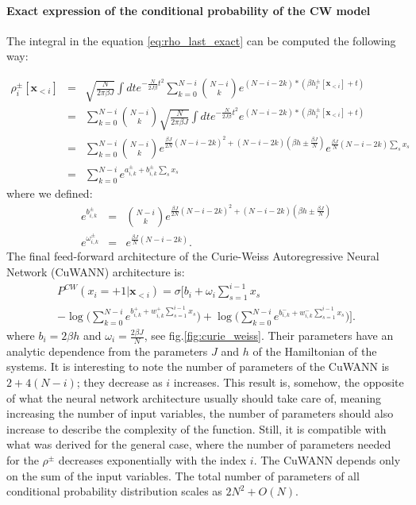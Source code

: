 \documentclass[aps,physrev,10pt,floatfix,longbibliography,nofootinbib,reprint]{revtex4-2}
\begin{document}
 \paragraph{Exact expression of the conditional probability of the CW model}
 The integral in the equation \ref{eq:rho_last_exact} can be computed the following way:

 \begin{eqnarray*}
 \rho_i^{\pm}[\mathbf{x}_{<i}] &=& \sqrt{\frac{N}{2\pi \beta J}}\int dt e^{-\frac{N}{2J \beta}t^{2}} 
 \sum_{k=0}^{N-i} \binom{N-i}{k} e^{(N-i-2k)*(\beta h_i^{\pm}[\mathbf{x}_{<i}] + t)}\\
 &=& \sum_{k=0}^{N-i} \binom{N-i}{k} \sqrt{\frac{N}{2\pi \beta J}}\int dt e^{-\frac{N}{2J \beta}t^{2}} 
  e^{(N-i-2k)*(\beta h_i^{\pm}[\mathbf{x}_{<i}] + t)}\\
&=& \sum_{k=0}^{N-i} \binom{N-i}{k}e^{\frac{\beta J}{2N}\left(N-i-2k\right)^{2}+\left(N-i-2k\right)\left(\beta h \pm \frac{\beta J}{N}\right)} e^{\frac{\beta J}{N}\left(N-i-2k\right) \sum_s x_s} \\
&=& \sum_{k=0}^{N-i} e^{a_{i,k}^{\pm} + b_{i,k}^{\pm} \sum_s x_s} 
\end{eqnarray*}
where we defined:
\begin{eqnarray}
\label{eq:params}
e^{b_{i,k}^{\pm}} & = & \binom{N-i}{k}e^{\frac{\beta J}{2N}\left(N-i-2k\right)^{2}+\left(N-i-2k\right)\left(\beta h \pm \frac{\beta J}{N}\right)}\\
e^{\omega_{i,k}^{\pm}} & = & e^{\frac{\beta J}{N}\left(N-i-2k\right)}.
\end{eqnarray}
The final feed-forward architecture of the Curie-Weiss Autoregressive Neural Network (CuWANN) architecture is:
\begin{multline}
\label{eq:curie_weiss_cond}
P^{CW}\left(x_{i}=+1|\mathbf{x}_{<i}\right)  =   \sigma \bigg[b_{i}+\omega_{i}\sum_{s=1}^{i-1}x_{s}\\
-\log\big(\sum_{k=0}^{N-i}e^{b_{i,k}^{+} + 
w_{i,k}^{+}\sum_{s=1}^{i-1}x_{s}}\big)+\log\big(\sum_{k=0}^{N-i}e^{b_{i,k}^{-} + w_{i,k}^{-}\sum_{s=1}^{i-1}x_{s}}\big)\bigg].
\end{multline}
where $b_i=2\beta h$ and $\omega_i=\frac{2\beta J}{N}$, see fig.\ref{fig:curie_weiss}. Their parameters have an analytic dependence from the parameters $J$ and $h$ of the Hamiltonian of the systems. 
It is interesting to note the number of parameters of the CuWANN is $2+4(N-i)$; they decrease as $i$ increases. This result is, somehow, the opposite of what the neural network architecture usually should take care of, meaning increasing the number of input variables, the number of parameters should also increase to describe the complexity of the function. Still, it is compatible with what was derived for the general case, where the number of parameters needed for the $\rho^{\pm}$ decreases exponentially with the index $i$. The CuWANN depends only on the sum of the input variables.
The total number of parameters of all conditional probability distribution scales as $2N^2+ O(N)$. 
\end{document}
